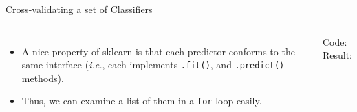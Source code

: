\documentclass[10pt, aspectratio=169]{beamer} %
\begin{document}
\begin{frame}[fragile]{Cross-validating a set of Classifiers}
\begin{columns}
\begin{itemize}
\item A nice property of sklearn is that each predictor conforms to the same interface
(\emph{i.e.}, each implements \verb+.fit()+, and \verb+.predict()+ methods).
\item Thus, we can examine a list of them in a \verb+for+ loop easily.

\end{itemize}
{\scriptsize Code:}\\
{\scriptsize Result:}\\
\end{columns}
\end{frame}
\end{document}
